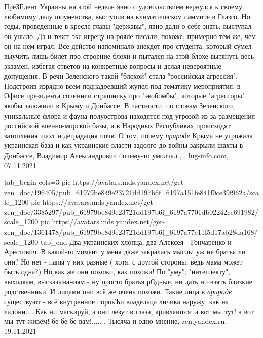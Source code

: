 ПреЗЕдент Украины на этой неделе явно с удовольствием вернулся к своему
любимому делу шоуменства, выступив на климатическом саммите в Глазго. Но годы,
проведенные в кресле главы "державы", явно дали о себе знать: выступал он
уныло.  Да и текст экс-игрецу на рояле писали, похоже, примерно тем же, чем он
на нем играл. Все действо напоминало анекдот про студента, который сумел
выучить лишь билет про строение блохи и пытался на этой блохе вытянуть весь
экзамен, избегая ответов на конкретные вопросы и делая невероятные допущения.
В речи Зеленского такой "блохой" стала "российская агрессия". Подстроив изрядно
всем поднадоевший жупел под тематику мероприятия, в Офисе президента сочинили
страшилку про "экобомбы", которые "агрессоры" якобы заложили в Крыму и
Донбассе. В частности, по словам Зеленского, уникальные флора и фауна
полуострова находятся под угрозой из-за размещения российской военно-морской
базы, а в Народных Республиках происходят затопления шахт и деградация почв. О
том, почему \emph{природе} Крыма не угрожала украинская база и как украинские
власти задолго до войны закрыли шахты в Донбассе, Владимир Александрович
почему-то умолчал
, 
, lug-info.com, 07.11.2021

\ifcmt
  tab_begin cols=3
     pic https://avatars.mds.yandex.net/get-zen_doc/196405/pub_61979be849e23721dd197b6f_6197a151fe841f0ce39f962a/scale_1200
     pic https://avatars.mds.yandex.net/get-zen_doc/3385297/pub_61979be849e23721dd197b6f_6197a7701db02242cc691982/scale_1200
		 pic https://avatars.mds.yandex.net/get-zen_doc/1361478/pub_61979be849e23721dd197b6f_6197a77e11f5d17ab28da168/scale_1200
  tab_end
\fi
Два украинских хлопца, два Алексея - Гончаренко и Арестович.  В какой-то момент
у меня даже закралась мысль: уж не братья ли они? Но нет - папы у них разные (
хотя, с другой стороны, ведь мама может быть одна?) Но как же они похожи, как
похожи! По "уму", "интеллекту", выходкам, высказываниям - ну просто братья
рОдные, ни дать ни взять близкие родственники.  И лицами они всё же очень
похожи. Такие лица в \emph{природе} существуют - всё внутренние порокЪи
владельца личика наружу, как на ладони.... Как ни маскируй, а они лезут в
глаза, кривляются: а вот мы тут! а вот мы тут живём! бе-бе-бе вам!.....
, 
Тысяча и одно мнение, zen.yandex.ru, 19.11.2021
